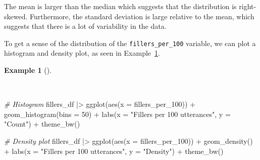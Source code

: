 \documentclass[
  letterpaper,
  DIV=11,
  numbers=noendperiod]{scrreprt}
\newenvironment{Shaded}{\begin{snugshade}}{\end{snugshade}}
\newcommand{\AttributeTok}[1]{\textcolor[rgb]{0.00,0.00,0.00}{#1}}
\newcommand{\CommentTok}[1]{\textcolor[rgb]{0.00,0.00,0.00}{\textit{#1}}}
\newcommand{\DecValTok}[1]{\textcolor[rgb]{0.00,0.00,0.00}{#1}}
\newcommand{\FunctionTok}[1]{\textcolor[rgb]{0.00,0.00,0.00}{#1}}
\newcommand{\NormalTok}[1]{\textcolor[rgb]{0.00,0.00,0.00}{#1}}
\newcommand{\SpecialCharTok}[1]{\textcolor[rgb]{0.00,0.00,0.00}{#1}}
\newcommand{\StringTok}[1]{\textcolor[rgb]{0.00,0.00,0.00}{#1}}
\theoremstyle{definition}
\newtheorem{example}{Example}[chapter]
\theoremstyle{remark}
\begin{document}
The mean is larger than the median which suggests that the distribution
is right-skewed. Furthermore, the standard deviation is large relative
to the mean, which suggests that there is a lot of variability in the
data.

To get a sense of the distribution of the \texttt{fillers\_per\_100}
variable, we can plot a histogram and density plot, as seen in
Example~\ref{exm-ida-num-uni-hist-dens}.

\begin{example}[]\protect\hypertarget{exm-ida-num-uni-hist-dens}{}\label{exm-ida-num-uni-hist-dens}

~

\begin{Shaded}
\begin{Highlighting}[]
\CommentTok{\# Histogram}
\NormalTok{fillers\_df }\SpecialCharTok{|\textgreater{}}
  \FunctionTok{ggplot}\NormalTok{(}\FunctionTok{aes}\NormalTok{(}\AttributeTok{x =}\NormalTok{ fillers\_per\_100)) }\SpecialCharTok{+}
  \FunctionTok{geom\_histogram}\NormalTok{(}\AttributeTok{bins =} \DecValTok{50}\NormalTok{) }\SpecialCharTok{+}
  \FunctionTok{labs}\NormalTok{(}\AttributeTok{x =} \StringTok{"Fillers per 100 utterances"}\NormalTok{, }\AttributeTok{y =} \StringTok{"Count"}\NormalTok{) }\SpecialCharTok{+}
  \FunctionTok{theme\_bw}\NormalTok{()}

\CommentTok{\# Density plot}
\NormalTok{fillers\_df }\SpecialCharTok{|\textgreater{}}
  \FunctionTok{ggplot}\NormalTok{(}\FunctionTok{aes}\NormalTok{(}\AttributeTok{x =}\NormalTok{ fillers\_per\_100)) }\SpecialCharTok{+}
  \FunctionTok{geom\_density}\NormalTok{() }\SpecialCharTok{+}
  \FunctionTok{labs}\NormalTok{(}\AttributeTok{x =} \StringTok{"Fillers per 100 utterances"}\NormalTok{, }\AttributeTok{y =} \StringTok{"Density"}\NormalTok{) }\SpecialCharTok{+}
  \FunctionTok{theme\_bw}\NormalTok{()}
\end{Highlighting}
\end{Shaded}

\begin{figure}[H]

\begin{minipage}{0.50\linewidth}



\end{minipage}%
%
\begin{minipage}{0.50\linewidth}


\end{minipage}
\end{figure}
\end{example}
\end{document}
